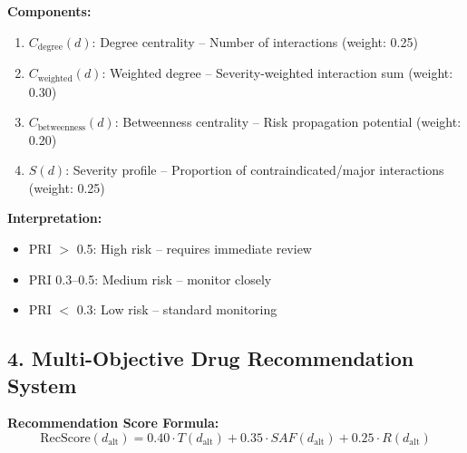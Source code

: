 \documentclass[11pt,a4paper]{article}
\begin{document}
\textbf{Components:}
\begin{enumerate}[label=(\roman*)]
    \item $C_{\text{degree}}(d)$: Degree centrality -- Number of interactions (weight: 0.25)
    \item $C_{\text{weighted}}(d)$: Weighted degree -- Severity-weighted interaction sum (weight: 0.30)
    \item $C_{\text{betweenness}}(d)$: Betweenness centrality -- Risk propagation potential (weight: 0.20)
    \item $S(d)$: Severity profile -- Proportion of contraindicated/major interactions (weight: 0.25)
\end{enumerate}

\textbf{Interpretation:}
\begin{itemize}
    \item PRI $>$ 0.5: High risk -- requires immediate review
    \item PRI 0.3--0.5: Medium risk -- monitor closely
    \item PRI $<$ 0.3: Low risk -- standard monitoring
\end{itemize}

\subsection*{4. Multi-Objective Drug Recommendation System}

\textbf{Recommendation Score Formula:}
\begin{equation}
\text{RecScore}(d_{\text{alt}}) = 0.40 \cdot T(d_{\text{alt}}) + 0.35 \cdot SAF(d_{\text{alt}}) + 0.25 \cdot R(d_{\text{alt}})
\end{equation}
\end{document}
